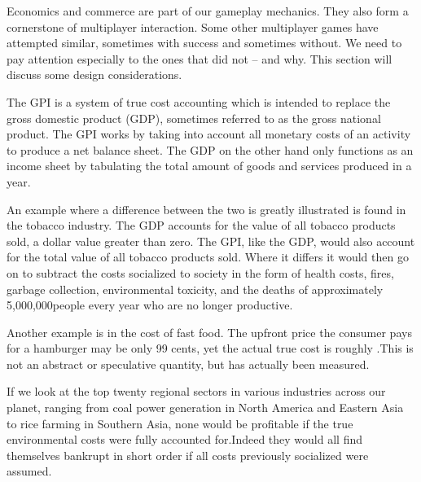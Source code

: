 

Economics and commerce are part of our gameplay mechanics. They also form a cornerstone of multiplayer interaction. Some other multiplayer games have attempted similar, sometimes with success and sometimes without. We need to pay attention especially to the ones that did not -- and why. This section will discuss some design considerations.

The GPI is a system of true cost accounting which is intended to replace the gross domestic product (GDP), sometimes referred to as the gross national product. The GPI works by taking into account all monetary costs of an activity to produce a net balance sheet. The GDP on the other hand only functions as an income sheet by tabulating the total amount of goods and services produced in a year.\footnotecite[cobb1999]

An example where a difference between the two is greatly illustrated is found in the tobacco industry. The GDP accounts for the value of all tobacco products sold, a dollar value greater than zero. The GPI, like the GDP, would also account for the total value of all tobacco products sold. Where it differs it would then go on to subtract the costs socialized to society in the form of health costs, fires, garbage collection, environmental toxicity, and the deaths of approximately 5,000,000 people every year who are no longer productive. 

Another example is in the cost of fast food. The upfront price the consumer pays for a hamburger may be only 99 cents, yet the actual true cost is roughly .\footnotecite[extras={ p.~46.}][raj2010] This is not an abstract or speculative quantity, but has actually been measured.

If we look at the top twenty regional sectors in various industries across our planet, ranging from coal power generation in North America and Eastern Asia to rice farming in Southern Asia, none would be profitable if the true environmental costs were fully accounted for.\footnotecite[roberts2013] Indeed they would all find themselves bankrupt in short order if all costs previously socialized were assumed.


